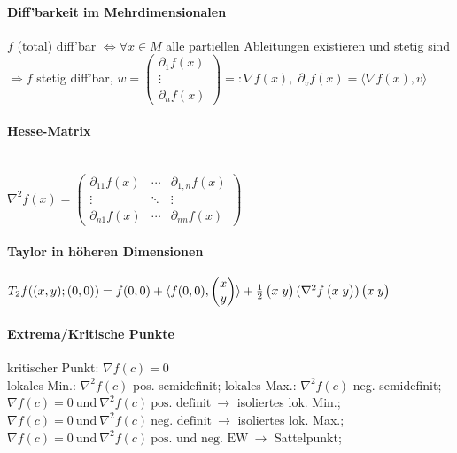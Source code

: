 \documentclass[paper=a3,paper=landscape, fontsize=9pt,DIV=25]{scrartcl}
\begin{document}
\begin{multicols*}{4}
 \paragraph{Diff'barkeit im Mehrdimensionalen}
 $f$ (total) diff'bar $\Leftrightarrow \forall x \in M$ alle partiellen Ableitungen existieren und stetig sind $\Rightarrow f$ stetig diff'bar, $w=\begin{pmatrix}
 \partial_1f(x)\\\vdots \\ \partial_nf(x)
 \end{pmatrix} =: \nabla f(x),\; \partial_vf(x)=\langle \nabla f(x), v \rangle$

 \paragraph{Hesse-Matrix}\hspace{0pt}\\
  $ \nabla^2f(x) = \begin{pmatrix}
  \partial_{11}f(x)  & \cdots & \partial_{1,n}f(x) \\
  \vdots  & \ddots & \vdots  \\
  \partial_{n1}f(x) & \cdots & \partial_{nn}f(x)
 \end{pmatrix}$



 \paragraph{Taylor in höheren Dimensionen}

  
 $\arraycolsep=1.4pt\def\arraystretch{1}
 T_2f((x,y);(0,0))=f(0,0)+\langle f(0,0),
 \begin{pmatrix}
   x\\
   y
 \end{pmatrix}
 \rangle + \frac{1}{2}
 \begin{pmatrix}
   x&y
 \end{pmatrix}
 (\nabla^2f
 \begin{pmatrix}
   x&y
 \end{pmatrix}
 )
 \begin{pmatrix}
   x&y
 \end{pmatrix}
 $

  \paragraph{Extrema/Kritische Punkte}
  kritischer Punkt: $\nabla f(c) = 0$\\
  lokales Min.: $\nabla^2f(c)$ pos. semidefinit;
  lokales Max.: $\nabla^2f(c)$ neg. semidefinit;
  $\nabla f(c)=0 \ \text{und}\ \nabla^2f(c) \ \text{pos. definit}\ \rightarrow$ isoliertes lok. Min.;
  $\nabla f(c)=0 \ \text{und}\ \nabla^2f(c) \ \text{neg. definit}\ \rightarrow$ isoliertes lok. Max.;
  $\nabla f(c)=0 \ \text{und}\ \nabla^2f(c) \ \text{pos. und neg. EW}\ \rightarrow$ Sattelpunkt;



\end{multicols*}
\end{document}
